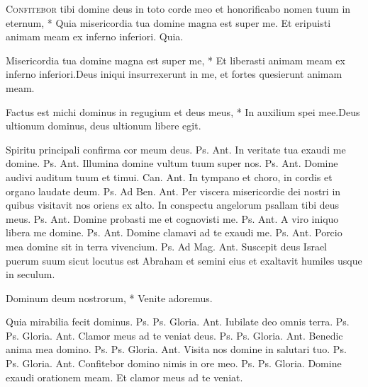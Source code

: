 \begin{multicols*}{2}
\lettrine[lines=2]{\zallmancaps \color{Red} C}{onfitebor} \hypertarget{confitebor-tibi}{\label{confitebor-tibi}} tibi domine deus in toto corde meo et honorificabo nomen tuum in eternum, * Quia misericordia tua domine magna est super me. \V Et eripuisti animam meam ex inferno inferiori. Quia.
\begin{responsory}
{Misericordia tua domine magna est super me, * Et liberasti animam meam ex inferno inferiori.}{Deus iniqui insurrexerunt in me, et fortes quesierunt animam meam.}
\end{responsory}
\begin{responsory-doxology}
{Factus est michi dominus in regugium et deus meus, * In auxilium spei mee.}{Deus ultionum dominus, deus ultionum libere egit.}
\end{responsory-doxology}
 Spiritu principali confirma cor meum deus. {\color{Red} Ps.}  {\color{Red} Ant.} In veritate tua exaudi me domine. {\color{Red} Ps.}  {\color{Red} Ant.} Illumina domine vultum tuum super nos. {\color{Red} Ps.}  {\color{Red} Ant.} Domine audivi auditum tuum et timui. {\color{Red} Can.}  {\color{Red} Ant.} In tympano et choro, in cordis et organo laudate deum. {\color{Red} Ps.}  {\color{Red} Ad Ben. Ant.} Per viscera misericordie dei nostri in quibus visitavit nos oriens ex alto.
 In conspectu angelorum psallam tibi deus meus. {\color{Red} Ps.}  {\color{Red} Ant.} Domine probasti me et cognovisti me. {\color{Red} Ps.}  {\color{Red} Ant.} A viro iniquo libera me domine. {\color{Red} Ps.}  {\color{Red} Ant.} Domine clamavi ad te exaudi me. {\color{Red} Ps.}  {\color{Red} Ant.} Porcio mea domine sit in terra vivencium. {\color{Red} Ps.}  {\color{Red} Ad Mag. Ant.} Suscepit deus Israel puerum suum sicut locutus est Abraham et semini eius et exaltavit humiles usque in seculum.
{\color{Red} }
\par {}
\begin{invitatory}
{Dominum deum nostrorum, * Venite adoremus.}
\end{invitatory}
 Quia mirabilia fecit dominus. {\color{Red} Ps.}  {\color{Red} Ps.}  Gloria. {\color{Red} Ant.} Iubilate deo omnis terra. {\color{Red} Ps.}  {\color{Red} Ps.}  Gloria. {\color{Red} Ant.} Clamor meus ad te veniat deus. {\color{Red} Ps.}  {\color{Red} Ps.}  Gloria. {\color{Red} Ant.} Benedic anima mea domino. {\color{Red} Ps.}  {\color{Red} Ps.}  Gloria. {\color{Red} Ant.} Visita nos domine in salutari tuo. {\color{Red} Ps.}  {\color{Red} Ps.}  Gloria. {\color{Red} Ant.} Confitebor domino nimis in ore meo. {\color{Red} Ps.}  {\color{Red} Ps.}  Gloria. \V Domine exaudi orationem meam. \R Et clamor meus ad te veniat. \R

\end{multicols*}
